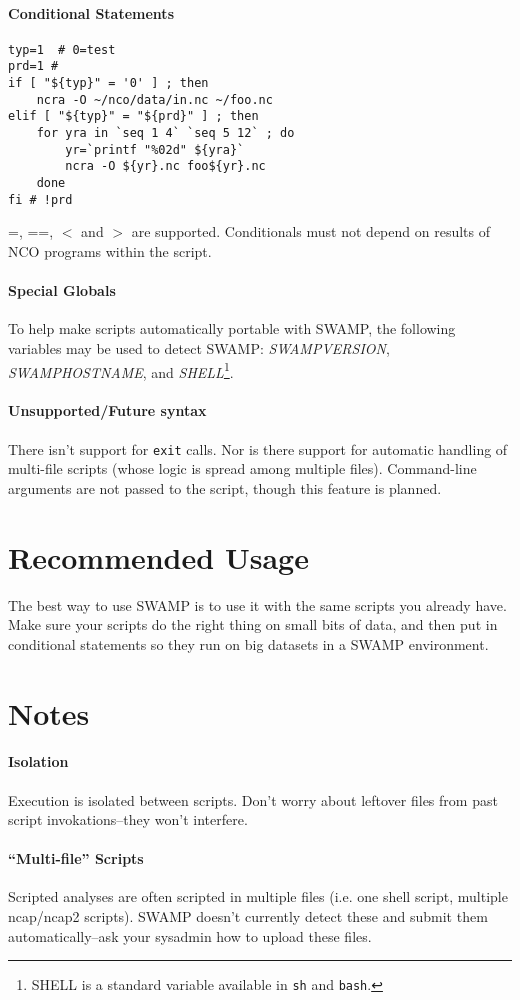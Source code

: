 \documentclass[letterpaper, twocolumn]{article}
\begin{document}
\paragraph{Conditional Statements}
\begin{verbatim}
typ=1  # 0=test
prd=1 #
if [ "${typ}" = '0' ] ; then
    ncra -O ~/nco/data/in.nc ~/foo.nc
elif [ "${typ}" = "${prd}" ] ; then 
    for yra in `seq 1 4` `seq 5 12` ; do
        yr=`printf "%02d" ${yra}`
        ncra -O ${yr}.nc foo${yr}.nc
    done
fi # !prd
\end{verbatim}
=, ==, $<$ and $>$ are supported.  Conditionals must not depend on
results of NCO programs within the script.

\paragraph{Special Globals}
To help make scripts automatically portable with SWAMP, the following
variables may be used to detect SWAMP: \emph{SWAMPVERSION},
\emph{SWAMPHOSTNAME}, and \emph{SHELL}\footnote{SHELL is a standard
  variable available in \texttt{sh} and \texttt{bash}.}.

\paragraph{Unsupported/Future syntax}
There isn't support for \texttt{exit} calls.  Nor is there support for
automatic handling of multi-file scripts (whose logic is spread among
multiple files).  Command-line arguments are not passed to the script,
though this feature is planned.

\section{Recommended Usage}
The best way to use SWAMP is to use it with the same scripts you
already have.  Make sure your scripts do the right thing on small bits
of data, and then put in conditional statements so they run on big
datasets in a SWAMP environment.

\section{Notes}

\paragraph{Isolation} Execution is isolated between scripts.  Don't
worry about leftover files from past script invokations--they won't
interfere.

\paragraph{``Multi-file'' Scripts} Scripted analyses are often
scripted in multiple files (i.e. one shell script, multiple ncap/ncap2
scripts).  SWAMP doesn't currently detect these and submit them
automatically--ask your sysadmin how to upload these files.
\end{document}
